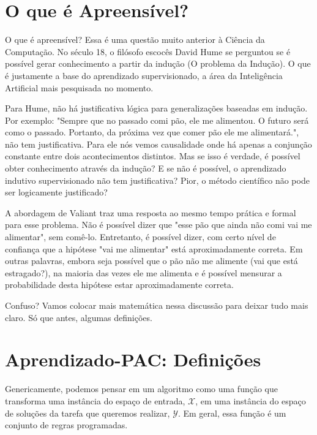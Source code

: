 \documentclass[
10pt, %
a4paper, %
onecolumn, %
]{article}
\begin{document}

\section*{O que é Apreensível?}

O que é apreensível? Essa é uma questão muito anterior à Ciência da Computação.  No século 18, o filósofo escocês David Hume se perguntou se é possível gerar conhecimento a partir da indução (O problema da Indução).  O que é justamente a base do aprendizado supervisionado, a área da Inteligência Artificial mais pesquisada no momento.  

Para Hume, não há justificativa lógica para generalizações baseadas em indução. Por exemplo: "Sempre que no passado comi pão, ele me alimentou. O futuro será como o passado. Portanto, da próxima vez que comer pão ele me alimentará.", não tem justificativa.  Para ele nós vemos causalidade onde há apenas a conjunção constante entre dois acontecimentos distintos. Mas se isso é verdade, é possível obter conhecimento através da indução?  E se não é possível, o aprendizado indutivo supervisionado não tem justificativa? Pior, o método científico não pode ser logicamente justificado?

A abordagem de Valiant traz uma resposta ao mesmo tempo prática e formal para esse problema.  Não é possível dizer que "esse pão que ainda não comi vai me alimentar", sem comê-lo. Entretanto, é possível dizer, com certo nível de confiança que a hipótese "vai me alimentar" está aproximadamente correta. Em outras palavras, embora seja possível que o pão não me alimente (vai que está estragado?), na maioria das vezes ele me alimenta e é possível mensurar a probabilidade desta hipótese estar aproximadamente correta. 

Confuso? Vamos colocar mais matemática nessa discussão para deixar tudo mais claro. Só que antes, algumas definições.



\section*{Aprendizado-PAC: Definições}

Genericamente, podemos pensar em um algoritmo como uma função que transforma uma  instância do espaço de entrada, $\mathcal{X}$, em uma instância do espaço de soluções da tarefa que queremos realizar, $\mathcal{Y}$. Em geral, essa função é um conjunto de regras programadas.
\end{document}
